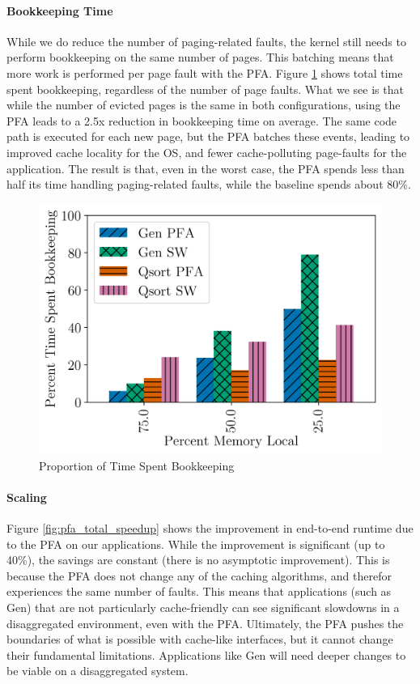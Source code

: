   \paragraph{Bookkeeping Time}
  While we do reduce the number of paging-related faults, the kernel still
  needs to perform bookkeeping on the same number of pages. This batching
  means that more work is performed per page fault with the PFA. Figure
  \ref{fig:pfa_bk_prop} shows total time spent bookkeeping, regardless of the
  number of page faults. What we see is that while the number of evicted pages
  is the same in both configurations, using the PFA leads to a 2.5x reduction
  in bookkeeping time on average. The same code path is executed for each
  new page, but the PFA batches these events, leading to improved cache locality
  for the OS, and fewer cache-polluting page-faults for the application. The
  result is that, even in the worst case, the PFA spends less than half its
  time handling paging-related faults, while the baseline spends about 80\%.

  \begin{figure}[h] \centering
    \includegraphics[width=0.8\columnwidth]{figs/bk_prop_all.png}
    \caption{Proportion of Time Spent Bookkeeping}
    \label{fig:pfa_bk_prop}
  \end{figure}

  \paragraph{Scaling}
  Figure \ref{fig:pfa_total_speedup} shows the improvement in end-to-end
  runtime due to the PFA on our applications. While the improvement is
  significant (up to 40\%), the savings are constant (there is no asymptotic
  improvement). This is because the PFA does not change any of the caching
  algorithms, and therefor experiences the same number of faults. This means
  that applications (such as Gen) that are not particularly cache-friendly can
  see significant slowdowns in a disaggregated environment, even with the PFA.
  Ultimately, the PFA pushes the boundaries of what is possible with cache-like
  interfaces, but it cannot change their fundamental limitations. Applications
  like Gen will need deeper changes to be viable on a disaggregated system.

